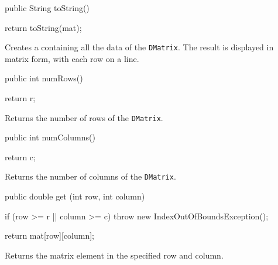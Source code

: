 \begin{code}

   public String toString() \begin{hide} {
      return toString(mat);
   } \end{hide}
\end{code}
\begin{tabb} Creates a  containing all the data of
  the \texttt{DMatrix}. The result is displayed in matrix form, with
  each row on a line.
\end{tabb}
\begin{htmlonly}
\end{htmlonly}
\begin{code}

   public int numRows() \begin{hide} {
      return r;
   } \end{hide}
\end{code}
\begin{tabb} Returns the number of rows of the \texttt{DMatrix}.
\end{tabb}
\begin{htmlonly}
\end{htmlonly}
\begin{code}

   public int numColumns() \begin{hide} {
      return c;
   } \end{hide}
\end{code}
\begin{tabb} Returns the number of columns of the \texttt{DMatrix}.
\end{tabb}
\begin{htmlonly}
\end{htmlonly}
\begin{code}

   public double get (int row, int column) \begin{hide} {
      if (row >= r || column >= c)
         throw new IndexOutOfBoundsException();

      return mat[row][column];
   } \end{hide}
\end{code}
\begin{tabb} Returns the matrix element in the specified row and column.
\end{tabb}
\begin{htmlonly}
\end{htmlonly}
